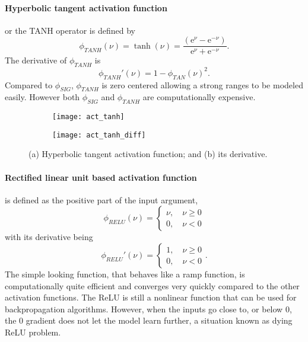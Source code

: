 \paragraph*{Hyperbolic tangent activation function} or the TANH operator is defined by 
\begin{equation}\label{app-act-5}
\phi_{TANH}(\nu)=\tanh(\nu)=\frac{\left(\text{e}^\nu-\text{e}^{-\nu}\right)}{\text{e}^{\nu}+\text{e}^{-\nu}}.
\end{equation}
The derivative of $ \phi_{TANH} $ is
\begin{equation}\label{app-act-5-1}
\phi_{TANH}'(\nu)=1-\phi_{TAN}(\nu)^2.
\end{equation}
Compared to $ \phi_{SIG} $, $ \phi_{TANH} $ is zero centered allowing a strong ranges to be modeled easily. However both $ \phi_{SIG} $ and $ \phi_{TANH} $ are computationally expensive.

\begin{figure}
	\centering
	\begin{subfigure}{0.45\textwidth}
		\texttt{[image: act\_tanh]}
		\caption{}
	\end{subfigure}
	\begin{subfigure}{0.45\textwidth}
		\texttt{[image: act\_tanh\_diff]}
		\caption{}
	\end{subfigure}
	\caption{(a) Hyperbolic tangent activation function; and (b) its derivative.}
\end{figure}

\paragraph*{Rectified linear unit based activation function} is defined as the positive part of the input argument,
\begin{equation}\label{app-act-6}
\phi_{RELU}(\nu)=
\begin{cases}
\nu,\quad \nu\ge0\\
0,\quad \nu<0
\end{cases}
\end{equation}
with its derivative being
\begin{equation}\label{app-act-6-1}
\phi_{RELU}'(\nu)=
\begin{cases}
1,\quad \nu\ge0\\
0,\quad \nu<0
\end{cases}.
\end{equation}
The simple looking function, that behaves like a ramp function, is computationally quite efficient and converges very quickly compared to the other activation functions. The ReLU is still a nonlinear function that can be used for backpropagation algorithms. However, when the inputs go close to, or below 0, the 0 gradient does not let the model learn further, a situation known as dying ReLU problem.

